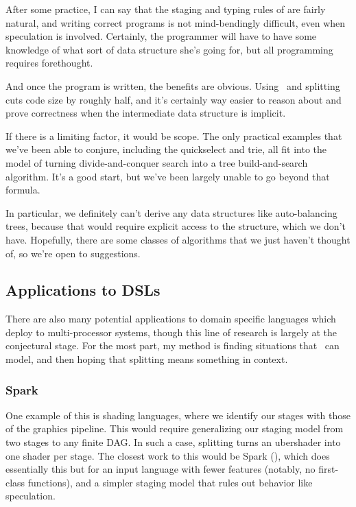 After some practice, I can say that the staging and typing rules of \lang are fairly natural, 
and writing correct programs is not mind-bendingly difficult, even when speculation is involved.
Certainly, the programmer will have to have some knowledge of what sort of data structure she's going for,
but all programming requires forethought.

And once the program is written, the benefits are obvious.
Using \lang\ and splitting cuts code size by roughly half,
and it's certainly way easier to reason about and prove correctness when the intermediate data structure is implicit.

If there is a limiting factor, it would be scope.  
The only practical examples that we've been able to conjure, including the quickselect and trie, 
all fit into the model of turning divide-and-conquer search into a tree build-and-search algorithm.  
It's a good start, but we've been largely unable to go beyond that formula.

In particular, we definitely can't derive any data structures like auto-balancing trees, 
because that would require explicit access to the structure, which we don't have.
Hopefully, there are some classes of algorithms that we just haven't thought of, so we're open to suggestions.

\subsection {Applications to DSLs}

There are also many potential applications to domain specific languages which deploy to multi-processor systems, 
though this line of research is largely at the conjectural stage.
For the most part, my method is finding situations that \lang\ can model, and then hoping that splitting means something in context.

\subsubsection{Spark}

One example of this is shading languages,
where we identify our stages with those of the graphics pipeline.
This would require generalizing our staging model from two stages to any finite DAG.
In such a case, splitting turns an ubershader into one shader per stage.
The closest work to this would be Spark (\cite{Foley:2011}), which does essentially this
but for an input language with fewer features (notably, no first-class functions), 
and a simpler staging model that rules out behavior like speculation.


